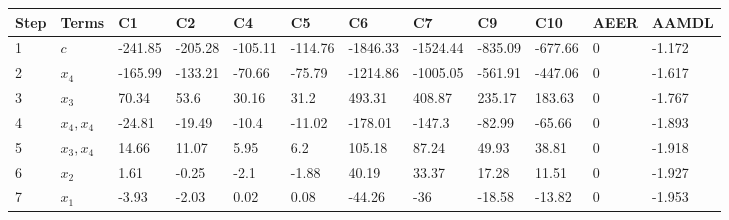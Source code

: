 \begin{tabular}{llllllllllll}
Step & Terms & C1 & C2 & C4 & C5 & C6 & C7 & C9 & C10 & AEER & AAMDL \\ 
\hline 
1 & $c$ & -241.85 & -205.28 & -105.11 & -114.76 & -1846.33 & -1524.44 & -835.09 & -677.66 & 0 & -1.172 \\ 
2 & $x_4$ & -165.99 & -133.21 & -70.66 & -75.79 & -1214.86 & -1005.05 & -561.91 & -447.06 & 0 & -1.617 \\ 
3 & $x_3$ & 70.34 & 53.6 & 30.16 & 31.2 & 493.31 & 408.87 & 235.17 & 183.63 & 0 & -1.767 \\ 
4 & $x_4,x_4$ & -24.81 & -19.49 & -10.4 & -11.02 & -178.01 & -147.3 & -82.99 & -65.66 & 0 & -1.893 \\ 
5 & $x_3,x_4$ & 14.66 & 11.07 & 5.95 & 6.2 & 105.18 & 87.24 & 49.93 & 38.81 & 0 & -1.918 \\ 
6 & $x_2$ & 1.61 & -0.25 & -2.1 & -1.88 & 40.19 & 33.37 & 17.28 & 11.51 & 0 & -1.927 \\ 
7 & $x_1$ & -3.93 & -2.03 & 0.02 & 0.08 & -44.26 & -36 & -18.58 & -13.82 & 0 & -1.953 \\ 
\hline 
\end{tabular}